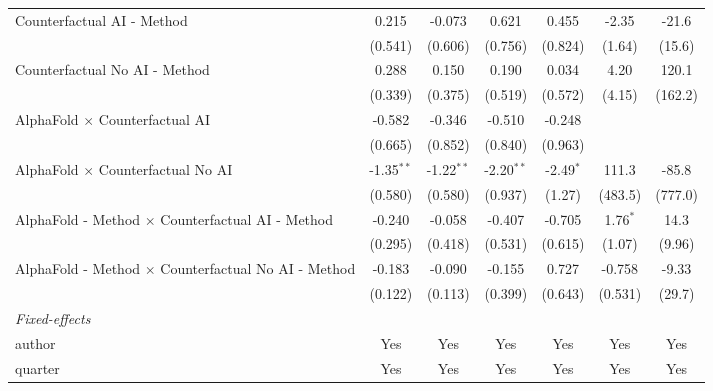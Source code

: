 \begin{tabular}{lcccccc}
   Counterfactual AI - Method                                 & 0.215        & -0.073       & 0.621        & 0.455       & -2.35      & -21.6\\   
                                                              & (0.541)      & (0.606)      & (0.756)      & (0.824)     & (1.64)     & (15.6)\\   
   Counterfactual No AI - Method                              & 0.288        & 0.150        & 0.190        & 0.034       & 4.20       & 120.1\\   
                                                              & (0.339)      & (0.375)      & (0.519)      & (0.572)     & (4.15)     & (162.2)\\   
   AlphaFold $\times$ Counterfactual AI                       & -0.582       & -0.346       & -0.510       & -0.248      &            &   \\   
                                                              & (0.665)      & (0.852)      & (0.840)      & (0.963)     &            &   \\   
   AlphaFold $\times$ Counterfactual No AI                    & -1.35$^{**}$ & -1.22$^{**}$ & -2.20$^{**}$ & -2.49$^{*}$ & 111.3      & -85.8\\   
                                                              & (0.580)      & (0.580)      & (0.937)      & (1.27)      & (483.5)    & (777.0)\\   
   AlphaFold - Method $\times$ Counterfactual AI - Method     & -0.240       & -0.058       & -0.407       & -0.705      & 1.76$^{*}$ & 14.3\\   
                                                              & (0.295)      & (0.418)      & (0.531)      & (0.615)     & (1.07)     & (9.96)\\   
   AlphaFold - Method $\times$ Counterfactual No AI - Method  & -0.183       & -0.090       & -0.155       & 0.727       & -0.758     & -9.33\\   
                                                              & (0.122)      & (0.113)      & (0.399)      & (0.643)     & (0.531)    & (29.7)\\   
   \midrule
   \emph{Fixed-effects}\\
   author                                                     & Yes          & Yes          & Yes          & Yes         & Yes        & Yes\\  
   quarter                                                    & Yes          & Yes          & Yes          & Yes         & Yes        & Yes\\  

\end{tabular}
